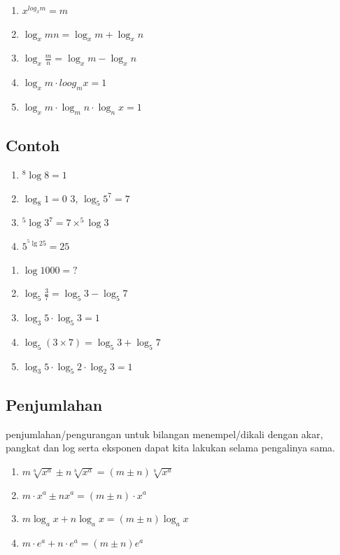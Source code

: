 \documentclass[
  letterpaper,
  DIV=11,
  numbers=noendperiod]{scrartcl}
\providecommand{\tightlist}{%
  \setlength{\itemsep}{0pt}\setlength{\parskip}{0pt}}\usepackage{longtable,booktabs,array}
\begin{document}
\begin{enumerate}
\def\labelenumi{\arabic{enumi}.}
\setcounter{enumi}{5}
\tightlist
\item
  \(x^{log_x m}=m\)
\item
  \(\log_x mn = \log_x m + \log_x n\)
\item
  \(\log_x \frac{m}{n}=\log_x m-\log_x n\)
\item
  \(\log_x m \cdot loog_m x =1\)
\item
  \(\log_x m \cdot \log_m n \cdot \log_n x=1\)
\end{enumerate}

\hypertarget{contoh-2}{%
\subsection{Contoh}\label{contoh-2}}

\begin{enumerate}
\def\labelenumi{\arabic{enumi}.}
\tightlist
\item
  \(^8\log 8=1\)
\item
  \(\log_8 1=0\) 3, \(\log_5 5^7=7\)
\item
  \(^5\log 3^7=7 \times ^5\log 3\)
\item
  \(5^{^5\lg 25}=25\)
\end{enumerate}

\begin{enumerate}
\def\labelenumi{\arabic{enumi}.}
\setcounter{enumi}{5}
\tightlist
\item
  \(\log 1000 = ?\)
\item
  \(\log_5 \frac{3}{7}=\log_5 3-\log_5 7\)
\item
  \(\log_3 5 \cdot \log_5 3 =1\)
\item
  \(\log_5 (3\times 7)=\log_5 3 + \log_5 7\)
\item
  \(\log_3 5 \cdot \log_5 2 \cdot \log_2 3=1\)
\end{enumerate}

\hypertarget{penjumlahan}{%
\subsection{Penjumlahan}\label{penjumlahan}}

penjumlahan/pengurangan untuk bilangan menempel/dikali dengan akar,
pangkat dan log serta eksponen dapat kita lakukan selama pengalinya
sama.

\begin{enumerate}
\def\labelenumi{\arabic{enumi}.}
\item
  \(m \sqrt[b]{x^a} \pm n \sqrt[b]{x^a}=(m \pm n)\sqrt[b]{x^a}\)
\item
  \(m \cdot x^a \pm n x^a=(m \pm n)\cdot x^a\)
\item
  \(m \log_a x+n \log_a x=(m\pm n) \log_a x\)
\item
  \(m \cdot e^a+n \cdot e^a=(m\pm n) e^a\)
\end{enumerate}
\end{document}
